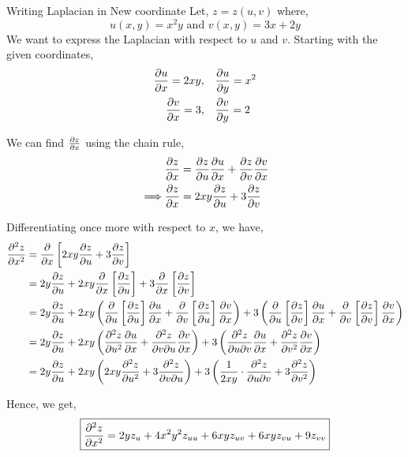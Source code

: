 \documentclass[../Analysis-3.tex]{subfiles}
\begin{document}
\begin{Eg}{Writing Laplacian in New coordinate}{}
    Let, $z = z(u,v)$ where, \[ u(x,y) = x^2y \text{ and } v(x,y) = 3x + 2y \]
    We want to express the Laplacian with respect to $u$ and $v$. Starting with the given coordinates, \begin{align*}
        \pdv{u}{x} = 2xy, \quad & \pdv{u}{y} = x^2 \\
        \pdv{v}{x} = 3, \quad   & \pdv{v}{y} = 2
    \end{align*}

    We can find $\pdv{z}{x}$ using the chain rule,
    \begin{align*}
                 & \pdv{z}{x} = \pdv{z}{u} \pdv{u}{x} + \pdv{z}{v} \pdv{v}{x} \\
        \implies & \pdv{z}{x} = 2xy \pdv{z}{u} + 3 \pdv{z}{v}                 \\
    \end{align*}

    Differentiating once more with respect to $x$, we have,
    \begin{align*}
        \pdv[2]{z}{x}
         & = \pdv{}{x} \left[ 2xy \pdv{z}{u} + 3 \pdv{z}{v} \right]                                                                                                                                                                                      \\
         & = 2y \pdv{z}{u} + 2xy \pdv{}{x} \left[\pdv{z}{u}\right]  + 3\pdv{}{x} \left[\pdv{z}{v}\right]                                                                                                                                                 \\
         & = 2y \pdv{z}{u} + 2xy \left(\pdv{}{u} \left[\pdv{z}{u}\right] \pdv{u}{x} + \pdv{}{v} \left[\pdv{z}{u}\right] \pdv{v}{x}\right)  + 3\left( \pdv{}{u} \left[\pdv{z}{v}\right] \pdv{u}{x} + \pdv{}{v} \left[\pdv{z}{v}\right] \pdv{v}{x} \right) \\
         & = 2y \pdv{z}{u} + 2xy \left(\pdv[2]{z}{u} \pdv{u}{x} + \pdv{z}{v}{u} \pdv{v}{x}\right)  + 3\left( \pdv{z}{u}{v} \pdv{u}{x} + \pdv[2]{z}{v} \pdv{v}{x}\right)                                                                                  \\
         & = 2y \pdv{z}{u} + 2xy \left(2xy \pdv[2]{z}{u}  + 3 \pdv{z}{v}{u}\right)  + 3\left( \frac{1}{2xy}\cdot\pdv{z}{u}{v}  + 3\pdv[2]{z}{v}\right)
    \end{align*}

    Hence, we get,
    \[
        \boxed{\pdv[2]{z}{x} = 2y z_u + 4x^2y^2z_{uu}+ 6xy z_{uv} + 6xy z_{vu} + 9z_{vv}}
    \]
\end{Eg}
\end{document}
